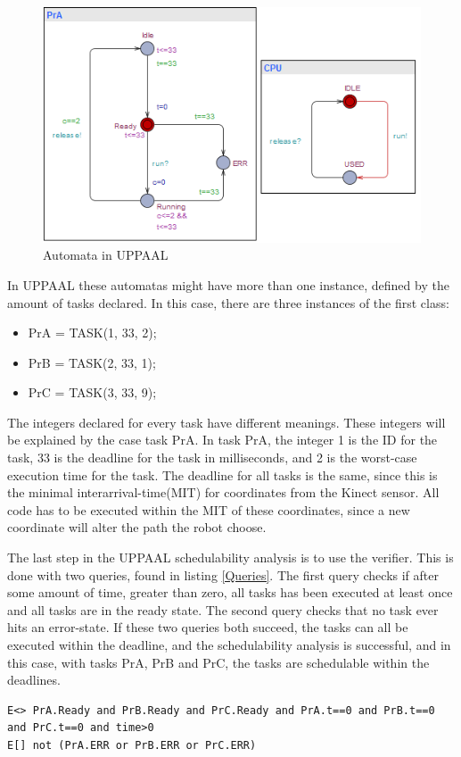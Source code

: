\begin{figure}[h]
	\centering
	\includegraphics[scale=1]{billeder/UPPAALPr}
	\caption{Automata in UPPAAL}
	\label{UPPAAL Automata}
\end{figure}

In UPPAAL these automatas might have more than one instance, defined by the amount of tasks declared. In this case, there are three instances of the first class:

\begin{itemize}
	\item PrA = TASK(1, 33, 2);
	\item PrB = TASK(2, 33, 1);
	\item PrC = TASK(3, 33, 9);
\end{itemize}

The integers declared for every task have different meanings. These integers will be explained by the case task PrA. In task PrA, the integer 1 is the ID for the task, 33 is the deadline for the task in milliseconds, and 2 is the worst-case execution time for the task. The deadline for all tasks is the same, since this is the minimal interarrival-time(MIT) for coordinates from the Kinect sensor. All code has to be executed within the MIT of these coordinates, since a new coordinate will alter the path the robot choose.

The last step in the UPPAAL schedulability analysis is to use the verifier. This is done with two queries, found in listing \ref{Queries}. The first query checks if after some amount of time, greater than zero, all tasks has been executed at least once and all tasks are in the ready state. The second query checks that no task ever hits an error-state. If these two queries both succeed, the tasks can all be executed within the deadline, and the schedulability analysis is successful, and in this case, with tasks PrA, PrB and PrC, the tasks are schedulable within the deadlines.

\begin{lstlisting}[caption={Queries for UPPAAL}, label={Queries}]
E<> PrA.Ready and PrB.Ready and PrC.Ready and PrA.t==0 and PrB.t==0 and PrC.t==0 and time>0
E[] not (PrA.ERR or PrB.ERR or PrC.ERR)
\end{lstlisting}
